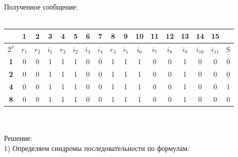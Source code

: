 \documentclass[12pt]{article}
\begin{document}
Полученное сообщение: \\
\\
\begin{tabular}{
|c|c|c|c|c|c|c|c|c|c|c|c|c|c|c|c|c|}
    \hline
     & 1 & 2 & 3 & 4 & 5 & 6 & 7 & 8 & 9 & 10 & 11 & 12 & 13 & 14 & 15 & \\
    \hline
    $2^x$ & $r_1$ & $r_2$ & $i_1$ & $r_3$ & $i_2$ & $i_3$ & $i_4$ & $r_4$ & $i_5$ & $i_6$ & $i_7$ &
    $i_8$ & $i_9$ & $i_{10}$ & $i_{11}$ & S\\
    \hline
    \textbf{1} & \cellcolor{cobalt} 0 & 0 & \cellcolor{cobalt} 1 & 1 & \cellcolor{cobalt} 1 & 0 & \cellcolor{cobalt} 0 & 1 & \cellcolor{cobalt} 1 & 1 & \cellcolor{cobalt} 0 & 0 & \cellcolor{cobalt} 1 & 0 & \cellcolor{cobalt} 0 & 0\\
    \hline
    \textbf{2} & 0 & \cellcolor{tacao} 0 & \cellcolor{tacao} 1 & 1 & 1 & \cellcolor{tacao} 0 & \cellcolor{tacao} 0 & 1 & 1 & \cellcolor{tacao} 1 & \cellcolor{tacao} 0 & 0 & 1 & \cellcolor{tacao} 0 & \cellcolor{tacao} 0 & 0\\
    \hline
    \textbf{4} & 0 & 0 & 1 & \cellcolor{feijoa} 1 & \cellcolor{feijoa} 1 & \cellcolor{feijoa} 0 & \cellcolor{feijoa} 0 & 1 & 1 & 1 & 0 &
    \cellcolor{feijoa} 0 & \cellcolor{feijoa} 1 & \cellcolor{feijoa} 0 & \cellcolor{feijoa} 0 & 1\\
    \hline
    \textbf{8} & 0 & 0 & 1 & 1 & 1 & 0 & 0 & \cellcolor{yellonge} 1 & \cellcolor{yellonge} 1 & \cellcolor{yellonge} 1 & \cellcolor{yellonge} 0 & \cellcolor{yellonge} 0 & \cellcolor{yellonge} 1 & \cellcolor{yellonge} 0 & \cellcolor{yellonge} 0 & 0\\
    \hline
\end{tabular}
\\
\\
Решение:\\
1) Определяем синдромы последовательности по формулам:
\end{document}
